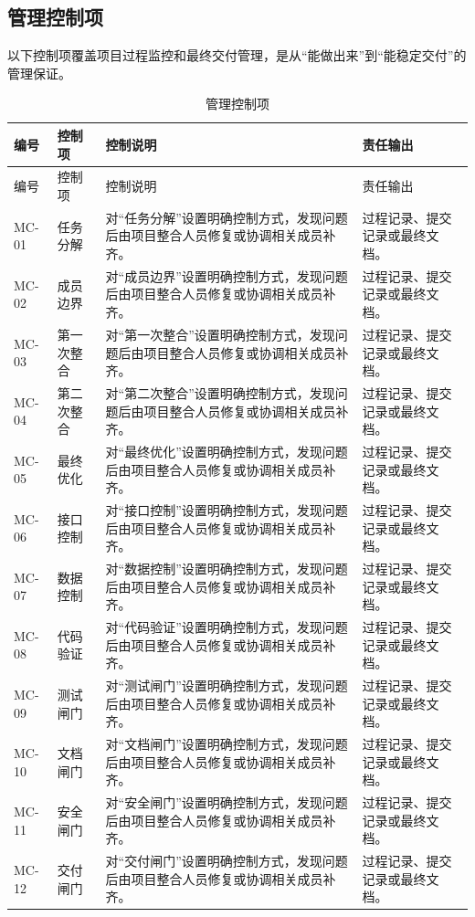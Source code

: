 \documentclass[12pt,a4paper]{ctexart}
\begin{document}
\subsection{管理控制项}
以下控制项覆盖项目过程监控和最终交付管理，是从“能做出来”到“能稳定交付”的管理保证。
\begin{longtable}{L{1.8cm}L{3.2cm}L{6.4cm}L{4.0cm}}
\caption{管理控制项}\\
\toprule
编号 & 控制项 & 控制说明 & 责任输出 \\
\midrule
\endfirsthead
\toprule
编号 & 控制项 & 控制说明 & 责任输出 \\
\midrule
\endhead
MC-01 & 任务分解 & 对“任务分解”设置明确控制方式，发现问题后由项目整合人员修复或协调相关成员补齐。 & 过程记录、提交记录或最终文档。 \\
MC-02 & 成员边界 & 对“成员边界”设置明确控制方式，发现问题后由项目整合人员修复或协调相关成员补齐。 & 过程记录、提交记录或最终文档。 \\
MC-03 & 第一次整合 & 对“第一次整合”设置明确控制方式，发现问题后由项目整合人员修复或协调相关成员补齐。 & 过程记录、提交记录或最终文档。 \\
MC-04 & 第二次整合 & 对“第二次整合”设置明确控制方式，发现问题后由项目整合人员修复或协调相关成员补齐。 & 过程记录、提交记录或最终文档。 \\
MC-05 & 最终优化 & 对“最终优化”设置明确控制方式，发现问题后由项目整合人员修复或协调相关成员补齐。 & 过程记录、提交记录或最终文档。 \\
MC-06 & 接口控制 & 对“接口控制”设置明确控制方式，发现问题后由项目整合人员修复或协调相关成员补齐。 & 过程记录、提交记录或最终文档。 \\
MC-07 & 数据控制 & 对“数据控制”设置明确控制方式，发现问题后由项目整合人员修复或协调相关成员补齐。 & 过程记录、提交记录或最终文档。 \\
MC-08 & 代码验证 & 对“代码验证”设置明确控制方式，发现问题后由项目整合人员修复或协调相关成员补齐。 & 过程记录、提交记录或最终文档。 \\
MC-09 & 测试闸门 & 对“测试闸门”设置明确控制方式，发现问题后由项目整合人员修复或协调相关成员补齐。 & 过程记录、提交记录或最终文档。 \\
MC-10 & 文档闸门 & 对“文档闸门”设置明确控制方式，发现问题后由项目整合人员修复或协调相关成员补齐。 & 过程记录、提交记录或最终文档。 \\
MC-11 & 安全闸门 & 对“安全闸门”设置明确控制方式，发现问题后由项目整合人员修复或协调相关成员补齐。 & 过程记录、提交记录或最终文档。 \\
MC-12 & 交付闸门 & 对“交付闸门”设置明确控制方式，发现问题后由项目整合人员修复或协调相关成员补齐。 & 过程记录、提交记录或最终文档。 \\

\end{longtable}
\end{document}
